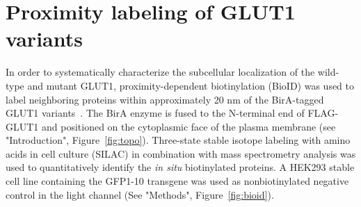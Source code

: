 \section{Proximity labeling of GLUT1 variants}
In order to systematically characterize the subcellular localization of the wild-type and mutant GLUT1, proximity-dependent biotinylation (BioID) was used to label neighboring proteins within approximately 20 nm of the BirA-tagged GLUT1 variants~\cite{Kim,Dong}. The BirA enzyme is fused to the N-terminal end of FLAG-GLUT1 and positioned on the cytoplasmic face of the plasma membrane (see "Introduction", Figure~\ref{fig:topo}). Three-state stable isotope labeling with amino acids in cell culture (SILAC) in combination with mass spectrometry analysis was used to quantitatively identify the \textit{in situ} biotinylated proteins. A HEK293 stable cell line containing the GFP1-10 transgene was used as nonbiotinylated negative control in the light channel (See "Methods", Figure~\ref{fig:bioid}). 

